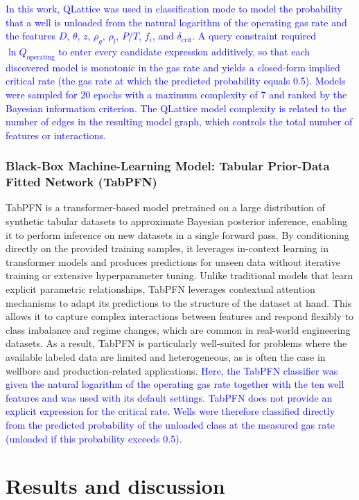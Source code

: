 \documentclass[journal=jacsat,manuscript=article]{achemso}
\newcommand{\al}{\textcolor{blue}}
\theoremstyle{thmstyleone}%
\theoremstyle{thmstyletwo}%
\theoremstyle{thmstylethree}%
\begin{document}
\al{In this work, QLattice was used in classification mode to model the probability that a well is unloaded from the natural logarithm of the operating gas rate and the features $D$, $\theta$, $z$, $\rho_g$, $\rho_l$, $P/T$, $f_i$, and $\delta_{\text{crit}}$. A query constraint required $\ln Q_{\text{operating}}$ to enter every candidate expression additively, so that each discovered model is monotonic in the gas rate and yields a closed-form implied critical rate (the gas rate at which the predicted probability equals 0.5). Models were sampled for 20 epochs with a maximum complexity of 7 and ranked by the Bayesian information criterion. The QLattice model complexity is related to the number of edges in the resulting model graph, which controls the total number of features or interactions.}

\subsubsection{Black-Box Machine-Learning Model: Tabular Prior-Data Fitted Network (TabPFN) }
TabPFN is a transformer-based model pretrained on a large distribution of synthetic tabular datasets to approximate Bayesian posterior inference, enabling it to perform inference on new datasets in a single forward pass. By conditioning directly on the provided training samples, it leverages in-context learning in transformer models \cite{kaplan2020scaling} and produces predictions for unseen data without iterative training or extensive hyperparameter tuning. Unlike traditional models that learn explicit parametric relationships, TabPFN leverages contextual attention mechanisms to adapt its predictions to the structure of the dataset at hand. This allows it to capture complex interactions between features and respond flexibly to class imbalance and regime changes, which are common in real-world engineering datasets. As a result, TabPFN is particularly well-suited for problems where the available labeled data are limited and heterogeneous, as is often the case in wellbore and production-related applications\cite{TabPFN-2.5}. \al{Here, the TabPFN classifier was given the natural logarithm of the operating gas rate together with the ten well features and was used with its default settings. TabPFN does not provide an explicit expression for the critical rate. Wells were therefore classified directly from the predicted probability of the unloaded class at the measured gas rate (unloaded if this probability exceeds 0.5).}

\section{\textbf{Results and discussion}}\label{sec:results}
\end{document}
